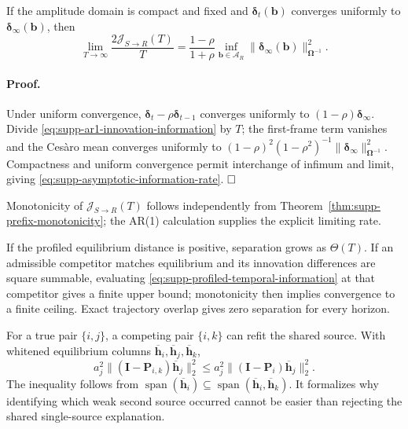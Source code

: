 \begin{theorem}
If the amplitude domain is compact and fixed and
$\bm\delta_t(\bm b)$ converges uniformly to
$\bm\delta_{\infty}(\bm b)$, then
\begin{equation}
 \lim_{T\rightarrow\infty}
 \frac{2\mathcal J_{S\rightarrow R}(T)}{T}
 =\frac{1-\rho}{1+\rho}
 \inf_{\bm b\in\mathcal A_R}
 \|\bm\delta_{\infty}(\bm b)\|_{\bm\Omega^{-1}}^2.
 \label{eq:supp-asymptotic-information-rate}
\end{equation}
\label{thm:supp-temporal-rate}
\end{theorem}

\paragraph{Proof.}
Under uniform convergence,
$\bm\delta_t-\rho\bm\delta_{t-1}$ converges uniformly to
$(1-\rho)\bm\delta_{\infty}$. Divide \eqref{eq:supp-ar1-innovation-information} by $T$; the first-frame term vanishes and the Ces\`aro mean converges uniformly to
$(1-\rho)^2(1-\rho^2)^{-1}
\|\bm\delta_{\infty}\|_{\bm\Omega^{-1}}^2$.
Compactness and uniform convergence permit interchange of infimum and limit, giving \eqref{eq:supp-asymptotic-information-rate}. $\hfill\square$

Monotonicity of $\mathcal J_{S\rightarrow R}(T)$ follows independently from
Theorem~\ref{thm:supp-prefix-monotonicity}; the AR(1) calculation supplies the
explicit limiting rate.

If the profiled equilibrium distance is positive, separation grows as $\Theta(T)$. If an admissible competitor matches equilibrium and its innovation differences are square summable, evaluating \eqref{eq:supp-profiled-temporal-information} at that competitor gives a finite upper bound; monotonicity then implies convergence to a finite ceiling. Exact trajectory overlap gives zero separation for every horizon.

For a true pair $\{i,j\}$, a competing pair $\{i,k\}$ can refit the shared source. With whitened equilibrium columns $\overline{\bm h}_i,\overline{\bm h}_j,\overline{\bm h}_k$,
\begin{equation}
 a_j^2\|(\bm I-\bm P_{i,k})\overline{\bm h}_j\|_2^2
 \le
 a_j^2\|(\bm I-\bm P_i)\overline{\bm h}_j\|_2^2.
 \label{eq:supp-shared-source-bottleneck}
\end{equation}
The inequality follows from
$\operatorname{span}(\overline{\bm h}_i)\subseteq
\operatorname{span}(\overline{\bm h}_i,\overline{\bm h}_k)$.
It formalizes why identifying which weak second source occurred cannot be easier than rejecting the shared single-source explanation.

